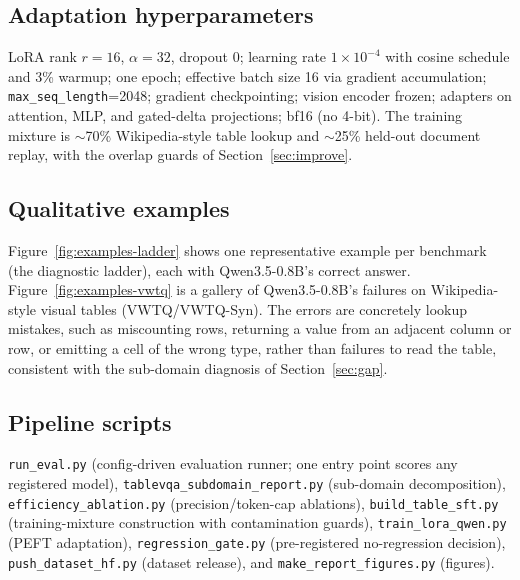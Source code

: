 \documentclass{article}
\begin{document}
\subsection{Adaptation hyperparameters}
LoRA rank $r{=}16$, $\alpha{=}32$, dropout $0$; learning rate $1\times10^{-4}$
with cosine schedule and 3\% warmup; one epoch; effective batch size 16 via
gradient accumulation; \texttt{max\_seq\_length}=2048; gradient checkpointing;
vision encoder frozen; adapters on attention, MLP, and gated-delta projections;
bf16 (no 4-bit). The training mixture is $\sim$70\% Wikipedia-style table
lookup and $\sim$25\% held-out document replay, with the overlap guards of
Section~\ref{sec:improve}.

\subsection{Qualitative examples}
Figure~\ref{fig:examples-ladder} shows one representative example per benchmark
(the diagnostic ladder), each with Qwen3.5-0.8B's correct answer.
Figure~\ref{fig:examples-vwtq} is a gallery of Qwen3.5-0.8B's failures on
Wikipedia-style visual tables (VWTQ/VWTQ-Syn). The errors are concretely lookup
mistakes, such as miscounting rows, returning a value from an adjacent column or
row, or emitting a cell of the wrong type, rather than failures to read the
table, consistent with the sub-domain diagnosis of Section~\ref{sec:gap}.


\subsection{Pipeline scripts}
\texttt{run\_eval.py} (config-driven evaluation runner; one entry point scores
any registered model), \texttt{tablevqa\_subdomain\_report.py} (sub-domain
decomposition), \texttt{efficiency\_ablation.py} (precision/token-cap
ablations), \texttt{build\_table\_sft.py} (training-mixture construction with
contamination guards), \texttt{train\_lora\_qwen.py} (PEFT adaptation),
\texttt{regression\_gate.py} (pre-registered no-regression decision),
\texttt{push\_dataset\_hf.py} (dataset release), and
\texttt{make\_report\_figures.py} (figures).
\end{document}
